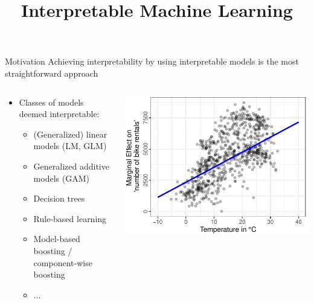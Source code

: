 \documentclass[11pt,compress,t,notes=noshow, aspectratio=169, xcolor=table]{beamer}
\title{Interpretable Machine Learning}
\date{}
\begin{document}
\newcommand{\titlefigure}{figure/whitebox}
\newcommand{\learninggoals}{
\item Why should we use interpretable models?
\item Advantages and disadvantages of interpretable models
}


\begin{frame}{Motivation}
Achieving interpretability by using interpretable models is the most straightforward approach
\bigskip
\begin{columns}[T, totalwidth = \linewidth]
    \begin{column}{0.5\textwidth}
    \begin{itemize}
        \bigskip
        \item Classes of models deemed interpretable:
        \begin{itemize}
            \item (Generalized) linear models (LM, GLM)
            \item Generalized additive models (GAM)
            \item Decision trees
            \item Rule-based learning
            \item Model-based boosting / component-wise boosting
            \item ...
        \end{itemize}
    \end{itemize}
    \end{column}
    \begin{column}{0.45\textwidth}  %
  \includegraphics[width = \textwidth]{figure/main_effect_lm_temp.pdf}

\end{column}
\end{columns}
\end{frame}
\end{document}
